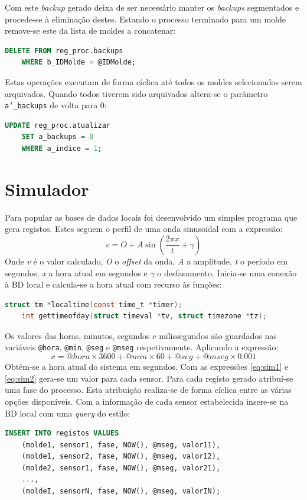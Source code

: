 \documentclass[11pt,twoside,a4paper]{report}
\begin{document}
Com este \textit{backup} gerado deixa de ser necessário manter os \textit{backups} segmentados e procede-se à eliminação destes. Estando o processo terminado para um molde remove-se este da lista de moldes a concatenar:
\begin{lstlisting}[language = SQL]
	DELETE FROM reg_proc.backups
	WHERE b_IDMolde = @IDMolde;
\end{lstlisting}
Estas operações executam de forma cíclica até todos os moldes selecionados serem arquivados. Quando todos tiverem sido arquivados altera-se o parâmetro \texttt{a\char`_backups} de volta para 0:
\begin{lstlisting}[language = SQL]
	UPDATE reg_proc.atualizar
	SET a_backups = 0
	WHERE a_indice = 1;
\end{lstlisting}

\section{Simulador}
Para popular as bases de dados locais foi desenvolvido um simples programa que gera registos. Estes seguem o perfil de uma onda sinusoidal com a expressão:
\begin{equation}
v = O + A\sin(\frac{2 \pi x}{t} + \gamma)
\label{eq:sim1}
\end{equation}
Onde \textit{v} é o valor calculado, \textit{O} o \textit{offset} da onda, \textit{A} a amplitude, \textit{t} o período em segundos, \textit{x} a hora atual em segundos e $ \gamma $ o desfasamento. Inicia-se uma conexão à BD local e calcula-se a hora atual com recurso às funções:
\begin{lstlisting}[language = C]
	struct tm *localtime(const time_t *timer);
	int gettimeofday(struct timeval *tv, struct timezone *tz);
\end{lstlisting}
Os valores das horas, minutos, segundos e milissegundos são guardados nas variáveis \texttt{@hora}, \texttt{@min}, \texttt{@seg} e \texttt{@mseg} respetivamente. Aplicando a expressão:
\begin{equation}
x = @hora \times 3600 + @min \times 60 + @seg + @mseg \times 0.001
\label{eq:sim2}
\end{equation}
Obtém-se a hora atual do sistema em segundos. Com as expressões \ref{eq:sim1} e \ref{eq:sim2} gera-se um valor para cada sensor. Para cada registo gerado atribuí-se uma fase do processo. Esta atribuição realiza-se de forma cíclica entre as várias opções disponíveis. Com a informação de cada sensor estabelecida insere-se na BD local com uma \textit{query} do estilo:
\begin{lstlisting}[language = SQL]
	INSERT INTO registos VALUES
	(molde1, sensor1, fase, NOW(), @mseg, valor11),
	(molde1, sensor2, fase, NOW(), @mseg, valor12),
	(molde2, sensor1, fase, NOW(), @mseg, valor21),
	...,
	(moldeI, sensorN, fase, NOW(), @mseg, valorIN);
\end{lstlisting}
\end{document}
